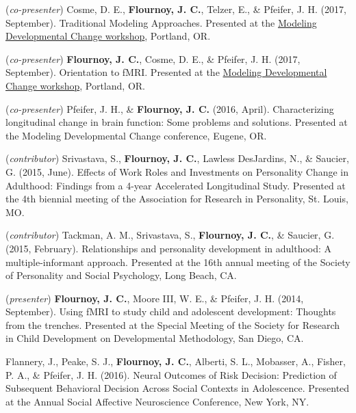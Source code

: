 \documentclass[11pt,article,oneside]{memoir}
\begin{document}
\bigskip
{}
\medskip

\ind (\textit{co-presenter}) Cosme, D. E., \textbf{Flournoy, J. C.}, Telzer, E., \& Pfeifer, J. H.  (2017, September). Traditional Modeling Approaches. Presented at the \href{https://osf.io/hym23/}{Modeling Developmental Change workshop}, Portland, OR.

\ind (\textit{co-presenter}) \textbf{Flournoy, J. C.}, Cosme, D. E., \& Pfeifer, J. H. (2017, September). Orientation to fMRI. Presented at the \href{https://osf.io/hym23/}{Modeling Developmental Change workshop}, Portland, OR.

\ind (\textit{co-presenter}) Pfeifer, J. H., \& \textbf{Flournoy, J. C.} (2016, April). Characterizing longitudinal change in brain function: Some problems and solutions. Presented at the Modeling Developmental Change conference, Eugene, OR.

\ind (\textit{contributor}) Srivastava, S., \textbf{Flournoy, J. C.}, Lawless DesJardins, N., \& Saucier, G. (2015, June). Effects of Work Roles and Investments on Personality Change in Adulthood: Findings from a 4-year Accelerated Longitudinal Study. Presented at the 4th biennial meeting of the Association for Research in Personality, St. Louis, MO.

\ind (\textit{contributor}) Tackman, A. M., Srivastava, S., \textbf{Flournoy, J. C.}, \& Saucier, G. (2015, February). Relationships and personality development in adulthood: A multiple-informant approach. Presented at the 16th annual meeting of the Society of Personality and Social Psychology, Long Beach, CA.

\ind (\textit{presenter}) \textbf{Flournoy, J. C.}, Moore III, W. E., \& Pfeifer, J. H. (2014, September). Using fMRI to study child and adolescent development: Thoughts from the trenches. Presented at the Special Meeting of the Society for Research in Child Development on Developmental Methodology, San Diego, CA.

\bigskip
{}
\medskip

\ind Flannery, J., Peake, S. J., \textbf{Flournoy, J. C.}, Alberti, S. L., Mobasser, A., Fisher, P. A., \& Pfeifer, J. H. (2016). Neural Outcomes of Risk Decision: Prediction of Subsequent Behavioral Decision Across Social Contexts in Adolescence. Presented at the Annual Social Affective Neuroscience Conference, New York, NY.
\end{document}
